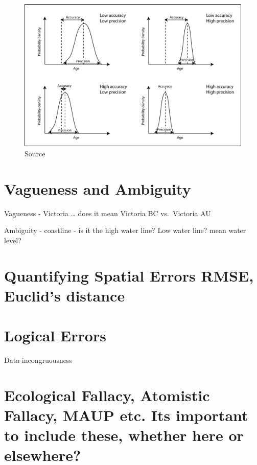\documentclass[
]{book}
\begin{document}
\begin{figure}
\centering
\includegraphics{images/16-accuracy-vs-precision2.png}
\caption{Source}
\end{figure}

\hypertarget{vagueness-and-ambiguity}{%
\section{Vagueness and Ambiguity}\label{vagueness-and-ambiguity}}

Vagueness - Victoria \ldots{} does it mean Victoria BC vs.~Victoria AU

Ambiguity - coastline - is it the high water line? Low water line? mean water level?

\hypertarget{quantifying-spatial-errors-rmse-euclids-distance}{%
\section{Quantifying Spatial Errors RMSE, Euclid's distance}\label{quantifying-spatial-errors-rmse-euclids-distance}}

\hypertarget{logical-errors}{%
\section{Logical Errors}\label{logical-errors}}

Data incongruousness

\hypertarget{ecological-fallacy-atomistic-fallacy-maup-etc.-its-important-to-include-these-whether-here-or-elsewhere}{%
\section{Ecological Fallacy, Atomistic Fallacy, MAUP etc. Its important to include these, whether here or elsewhere?}\label{ecological-fallacy-atomistic-fallacy-maup-etc.-its-important-to-include-these-whether-here-or-elsewhere}}
\end{document}
